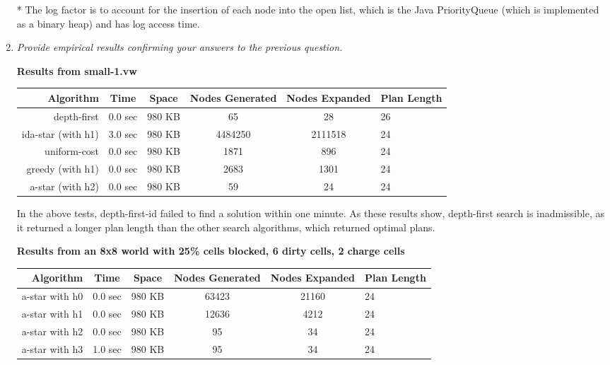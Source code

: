 \documentclass[letterpaper,11pt]{article}
\begin{document}
\begin{enumerate}
* The log factor is to account for the insertion of each node into the open list, which is the Java PriorityQueue (which is implemented as a binary heap) and has log access time.

\item \emph{Provide empirical results confirming your answers to the previous question.}

\begin{center}
\textbf{Results from small-1.vw}
  \begin{tabular}{r | c | c | c | c | l }
    Algorithm      & Time    & Space  & Nodes Generated & Nodes Expanded & Plan Length \\ \hline
    \hline
    depth-first    & 0.0 sec  & 980 KB & 65              & 28             & 26          \\ \hline
    ida-star (with h1) & 3.0 sec  & 980 KB & 4484250         & 2111518    & 24          \\ \hline
    uniform-cost   & 0.0 sec  & 980 KB & 1871            & 896            & 24          \\ \hline
    greedy (with h1)& 0.0 sec & 980 KB & 2683            & 1301           & 24          \\ \hline
    a-star (with h2)& 0.0 sec & 980 KB & 59              & 24             & 24          \\ \hline
    \hline
  \end{tabular}
\end{center}

In the above tests, depth-first-id failed to find a solution within one minute.  As these results show, depth-first search is inadmissible, as it returned a longer plan length than the other search algorithms, which returned optimal plans.

\begin{center}
\textbf{Results from an 8x8 world with 25\% cells blocked, 6 dirty cells, 2 charge cells}
  \begin{tabular}{r | c | c | c | c | l }
    Algorithm      & Time    & Space  & Nodes Generated & Nodes Expanded & Plan Length \\ \hline
    \hline
    a-star with h0 & 0.0 sec & 980 KB & 63423           & 21160          & 24          \\ \hline
    a-star with h1 & 0.0 sec & 980 KB & 12636           & 4212           & 24          \\ \hline
    a-star with h2 & 0.0 sec & 980 KB & 95              & 34             & 24          \\ \hline
    a-star with h3 & 1.0 sec & 980 KB & 95              & 34             & 24          \\ \hline
    \hline
  \end{tabular}
\end{center}


\end{enumerate}
\end{document}
